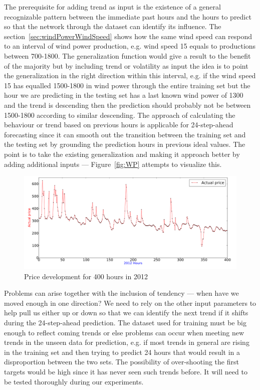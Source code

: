 The prerequisite for adding trend as input is the existence of a general recognizable pattern between the immediate past hours and the hours to predict so that the network through the dataset can identify its influence. The section~\ref{sec:windPowerWindSpeed} shows how the same wind speed can respond to an interval of wind power production, e.g. wind speed 15 equals to productions between 700-1800. The generalization function would give a result to the benefit of the majority but by including trend or volatility as input the idea is to point the generalization in the right direction within this interval, e.g. if the wind speed 15 has equalled 1500-1800 in wind power through the entire training set but the hour we are predicting in the testing set has a last known wind power of 1300 and the trend is descending then the prediction should probably not be between 1500-1800 according to similar descending. The approach of calculating the behaviour or trend based on previous hours is applicable for 24-step-ahead forecasting since it can smooth out the transition between the training set and the testing set by grounding the prediction hours in previous ideal values. The point is to take the existing generalization and making it approach better by adding additional inputs --- Figure~\ref{fig:WP} attempts to visualize this. 

\begin{figure}[h]
\centering
\includegraphics[width=0.99\linewidth]{billeder/priceGraph400.png}
\caption{Price development for 400 hours in 2012}
\label{fig:priceHourDevelopment400HoursStatistics}
\end{figure}

Problems can arise together with the inclusion of tendency --- when have we moved enough in one direction? We need to rely on the other input parameters to help pull us either up or down so that we can identify the next trend if it shifts during the 24-step-ahead prediction. The dataset used for training must be big enough to reflect coming trends or else problems can occur when meeting new trends in the unseen data for prediction, e.g. if most trends in general are rising in the training set and then trying to predict 24 hours that would result in a disproportion between the two sets. The possibility of over-shooting the first targets would be high since it has never seen such trends before. It will need to be tested thoroughly during our experiments. 

